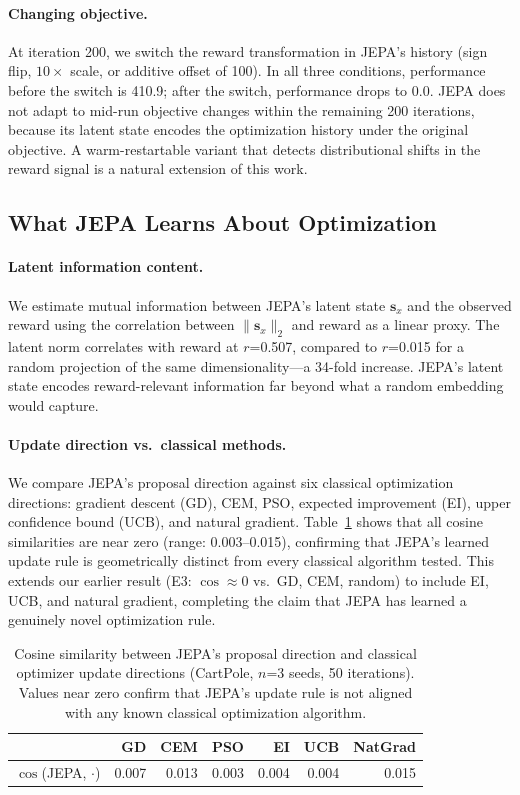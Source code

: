 \paragraph{Changing objective.}
At iteration 200, we switch the reward transformation in JEPA's
history (sign flip, $10\times$ scale, or additive offset of 100).
In all three conditions, performance before the switch is 410.9;
after the switch, performance drops to 0.0.
JEPA does not adapt to mid-run objective changes within the
remaining 200 iterations, because its latent state encodes the
optimization history under the original objective.
A warm-restartable variant that detects distributional shifts in
the reward signal is a natural extension of this work.

\subsection{What JEPA Learns About Optimization}
\label{sec:what_jepa_learns}

\paragraph{Latent information content.}
We estimate mutual information between JEPA's latent state
$\mathbf{s}_x$ and the observed reward using the correlation between
$\|\mathbf{s}_x\|_2$ and reward as a linear proxy.
The latent norm correlates with reward at $r$=0.507,
compared to $r$=0.015 for a random projection of the same
dimensionality---a 34-fold increase.
JEPA's latent state encodes reward-relevant information far beyond
what a random embedding would capture.

\paragraph{Update direction vs.\ classical methods.}
We compare JEPA's proposal direction against six classical optimization
directions: gradient descent (GD), CEM, PSO, expected improvement (EI),
upper confidence bound (UCB), and natural gradient.
Table~\ref{tab:direction_similarity} shows that all cosine similarities
are near zero (range: 0.003--0.015), confirming that JEPA's learned
update rule is geometrically distinct from every classical algorithm
tested.
This extends our earlier result (E3: $\cos\approx 0$ vs.\ GD, CEM,
random) to include EI, UCB, and natural gradient, completing the
claim that JEPA has learned a genuinely novel optimization rule.

\begin{table}[t]
\centering
\caption{Cosine similarity between JEPA's proposal direction
and classical optimizer update directions (CartPole, $n$=3 seeds,
50 iterations). Values near zero confirm that JEPA's update rule
is not aligned with any known classical optimization algorithm.}
\label{tab:direction_similarity}
\begin{tabular}{lrrrrrr}
\toprule
 & GD & CEM & PSO & EI & UCB & NatGrad \\
\midrule
$\cos$(JEPA, $\cdot$) &
  0.007 & 0.013 & 0.003 & 0.004 & 0.004 & 0.015 \\
\bottomrule
\end{tabular}
\end{table}

